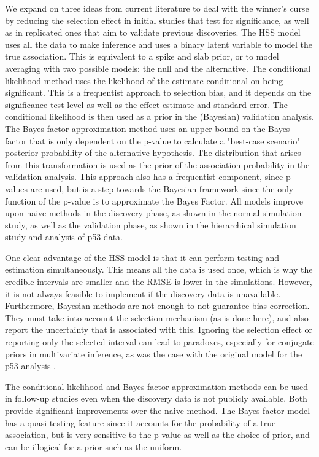 \documentclass[AMA,STIX1COL]{WileyNJD-v2}\usepackage[]{graphicx}\usepackage[]{color}
\begin{document}
We expand on three ideas from current literature to deal with the winner's curse by reducing the selection effect in initial studies that test for significance, as well as in replicated ones that aim to validate previous discoveries. The HSS model uses all the data to make inference and uses a binary latent variable to model the true association. This is equivalent to a spike and slab prior, or to model averaging with two possible models: the null and the alternative.  The conditional likelihood method uses the likelihood of the estimate conditional on being significant. This is a frequentist approach to selection bias, and it depends on the significance test level as well as the effect estimate and standard error. The conditional likelihood is then used as a prior in the (Bayesian) validation analysis. The Bayes factor approximation method uses an upper bound on the Bayes factor that is only dependent on the p-value to calculate a "best-case scenario" posterior probability of the alternative hypothesis. The distribution that arises from this transformation is used as the prior of the association probability in the validation analysis. This approach also has a frequentist component, since p-values are used, but is a step towards the Bayesian framework since the only function of the p-value is to approximate the Bayes Factor. All models improve upon naive methods in the discovery phase, as shown in the normal simulation study, as well as the validation phase, as shown in the hierarchical simulation study and analysis of p53 data.

One clear advantage of the HSS model is that it can perform testing and estimation simultaneously. This means all the data is used once, which is why the credible intervals are smaller and the RMSE is lower in the simulations. However, it is not always feasible to implement if the discovery data is unavailable. Furthermore, Bayesian methods are not enough to not guarantee bias correction. They must take into account the selection mechanism (as is done here), and also report the uncertainty that is associated with this. Ignoring the selection effect or reporting only the selected interval can lead to paradoxes, especially for conjugate priors in multivariate inference, as was the case with the original model for the p53 analysis \cite{dawid1994selection}.

The conditional likelihood and Bayes factor approximation methods can be used in follow-up studies even when the discovery data is not publicly available. Both provide significant improvements over the naive method. The Bayes factor model has a quasi-testing feature since it accounts for the probability of a true association, but is very sensitive to the p-value as well as the choice of prior, and can be illogical for a prior such as the uniform.
\end{document}
